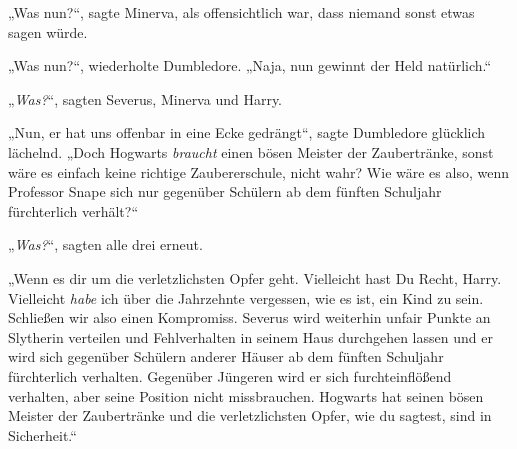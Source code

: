 „Was nun?“, sagte Minerva, als offensichtlich war, dass niemand sonst etwas sagen würde.

„Was nun?“, wiederholte Dumbledore. „Naja, nun gewinnt der Held natürlich.“

„\emph{Was?}“, sagten Severus, Minerva und Harry.

„Nun, er hat uns offenbar in eine Ecke gedrängt“, sagte Dumbledore glücklich lächelnd. „Doch Hogwarts \emph{braucht} einen bösen Meister der Zaubertränke, sonst wäre es einfach keine richtige Zaubererschule, nicht wahr? Wie wäre es also, wenn Professor Snape sich nur gegenüber Schülern ab dem fünften Schuljahr fürchterlich verhält?“

„\emph{Was?}“, sagten alle drei erneut.

„Wenn es dir um die verletzlichsten Opfer geht. Vielleicht hast Du Recht, Harry. Vielleicht \emph{habe} ich über die Jahrzehnte vergessen, wie es ist, ein Kind zu sein. Schließen wir also einen Kompromiss. Severus wird weiterhin unfair Punkte an Slytherin verteilen und Fehlverhalten in seinem Haus durchgehen lassen und er wird sich gegenüber Schülern anderer Häuser ab dem fünften Schuljahr fürchterlich verhalten. Gegenüber Jüngeren wird er sich furchteinflößend verhalten, aber seine Position nicht missbrauchen. Hogwarts hat seinen bösen Meister der Zaubertränke und die verletzlichsten Opfer, wie du sagtest, sind in Sicherheit.“


